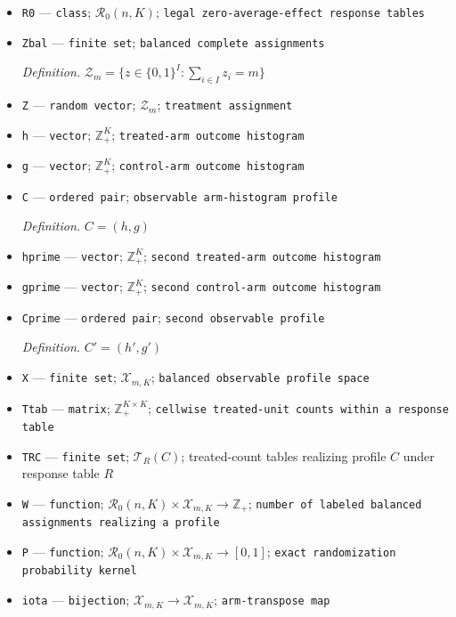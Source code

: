 \documentclass{article}
\begin{document}
\begin{itemize}
  \item \texttt{R0} --- \texttt{class}; \(\mathcal R_0(n,K)\); \texttt{legal zero-\allowbreak{}average-\allowbreak{}effect response tables}
  \item \texttt{Zbal} --- \texttt{finite set}; \texttt{balanced complete assignments}
  \par\smallskip\noindent\emph{Definition.} \(\mathcal Z_m=\{z\in\{0,1\}^{I}:\sum_{i\in I}z_i=m\}\)
  \item \texttt{Z} --- \texttt{random vector}; \(\mathcal Z_m\); \texttt{treatment assignment}
  \item \texttt{h} --- \texttt{vector}; \(\mathbb Z_+^K\); \texttt{treated-\allowbreak{}arm outcome histogram}
  \item \texttt{g} --- \texttt{vector}; \(\mathbb Z_+^K\); \texttt{control-\allowbreak{}arm outcome histogram}
  \item \texttt{C} --- \texttt{ordered pair}; \texttt{observable arm-\allowbreak{}histogram profile}
  \par\smallskip\noindent\emph{Definition.} \(C=(h,g)\)
  \item \texttt{hprime} --- \texttt{vector}; \(\mathbb Z_+^K\); \texttt{second treated-\allowbreak{}arm outcome histogram}
  \item \texttt{gprime} --- \texttt{vector}; \(\mathbb Z_+^K\); \texttt{second control-\allowbreak{}arm outcome histogram}
  \item \texttt{Cprime} --- \texttt{ordered pair}; \texttt{second observable profile}
  \par\smallskip\noindent\emph{Definition.} \(C'=(h',g')\)
  \item \texttt{X} --- \texttt{finite set}; \(\mathcal X_{m,K}\); \texttt{balanced observable profile space}
  \item \texttt{Ttab} --- \texttt{matrix}; \(\mathbb Z_+^{K\times K}\); \texttt{cellwise treated-\allowbreak{}unit counts within a response table}
  \item \texttt{TRC} --- \texttt{finite set}; \(\mathcal T_R(C)\); treated-count tables realizing profile \(C\) under response table \(R\)
  \item \texttt{W} --- \texttt{function}; \(\mathcal R_0(n,K)\times\mathcal X_{m,K}\to\mathbb Z_+\); \texttt{number of labeled balanced assignments realizing a profile}
  \item \texttt{P} --- \texttt{function}; \(\mathcal R_0(n,K)\times\mathcal X_{m,K}\to[0,1]\); \texttt{exact randomization probability kernel}
  \item \texttt{iota} --- \texttt{bijection}; \(\mathcal X_{m,K}\to\mathcal X_{m,K}\); \texttt{arm-\allowbreak{}transpose map}

\end{itemize}
\end{document}
